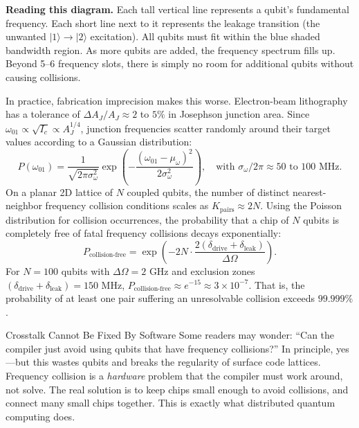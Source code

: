 \noindent \textbf{Reading this diagram.} Each tall vertical line represents a qubit's fundamental frequency. Each short line next to it represents the leakage transition (the unwanted $|1\rangle \to |2\rangle$ excitation). All qubits must fit within the blue shaded bandwidth region. As more qubits are added, the frequency spectrum fills up. Beyond 5--6 frequency slots, there is simply no room for additional qubits without causing collisions.

In practice, fabrication imprecision makes this worse. Electron-beam lithography has a tolerance of $\Delta A_J / A_J \approx 2$ to $5\%$ in Josephson junction area. Since $\omega_{01} \propto \sqrt{I_c} \propto A_J^{1/4}$, junction frequencies scatter randomly around their target values according to a Gaussian distribution:
\begin{equation}
    P(\omega_{01}) = \frac{1}{\sqrt{2\pi \sigma_\omega^2}} \exp\left( -\frac{(\omega_{01} - \mu_\omega)^2}{2\sigma_\omega^2} \right), \quad \text{with } \sigma_\omega/2\pi \approx 50\text{ to }100\text{ MHz}.
\end{equation}
On a planar 2D lattice of $N$ coupled qubits, the number of distinct nearest-neighbor frequency collision conditions scales as $K_{\text{pairs}} \approx 2N$. Using the Poisson distribution for collision occurrences, the probability that a chip of $N$ qubits is completely free of fatal frequency collisions decays exponentially:
\begin{equation}
    P_{\text{collision-free}} = \exp\left( -2N \cdot \frac{2(\delta_{\text{drive}} + \delta_{\text{leak}})}{\Delta \Omega} \right).
\end{equation}
For $N = 100$ qubits with $\Delta \Omega = 2\text{ GHz}$ and exclusion zones $(\delta_{\text{drive}} + \delta_{\text{leak}}) = 150\text{ MHz}$, $P_{\text{collision-free}} \approx e^{-15} \approx 3 \times 10^{-7}$. That is, the probability of at least one pair suffering an unresolvable collision exceeds $99.999\%$.

\begin{cautionbox}{Crosstalk Cannot Be Fixed By Software}
Some readers may wonder: ``Can the compiler just avoid using qubits that have frequency collisions?'' In principle, yes---but this wastes qubits and breaks the regularity of surface code lattices. Frequency collision is a \textit{hardware} problem that the compiler must work around, not solve. The real solution is to keep chips small enough to avoid collisions, and connect many small chips together. This is exactly what distributed quantum computing does.
\end{cautionbox}

